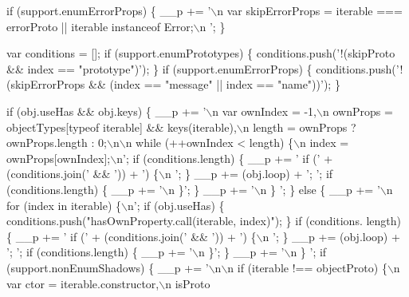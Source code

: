 \begin{DoxyCodeInclude}
       \textcolor{keywordflow}{if} (support.enumErrorProps) \{
      \_\_p += \textcolor{stringliteral}{'\(\backslash\)n  var skipErrorProps = iterable === errorProto || iterable instanceof Error;\(\backslash\)n  '};
       \}

          var conditions = [];    \textcolor{keywordflow}{if} (support.enumPrototypes) \{ conditions.push(\textcolor{stringliteral}{'!(skipProto && index ==
       "prototype")'}); \}    \textcolor{keywordflow}{if} (support.enumErrorProps)  \{ conditions.push(\textcolor{stringliteral}{'!(skipErrorProps && (index == "message"
       || index == "name"))'}); \}

       \textcolor{keywordflow}{if} (obj.useHas && obj.keys) \{
      \_\_p += \textcolor{stringliteral}{'\(\backslash\)n  var ownIndex = -1,\(\backslash\)n      ownProps = objectTypes[typeof iterable] && keys(iterable),\(\backslash\)n   
         length = ownProps ? ownProps.length : 0;\(\backslash\)n\(\backslash\)n  while (++ownIndex < length) \{\(\backslash\)n    index =
       ownProps[ownIndex];\(\backslash\)n'};
          \textcolor{keywordflow}{if} (conditions.length) \{
      \_\_p += \textcolor{stringliteral}{'    if ('} +
      (conditions.join(\textcolor{stringliteral}{' && '})) +
      \textcolor{stringliteral}{') \{\(\backslash\)n  '};
       \}
      \_\_p +=
      (obj.loop) +
      \textcolor{stringliteral}{';    '};
       \textcolor{keywordflow}{if} (conditions.length) \{
      \_\_p += \textcolor{stringliteral}{'\(\backslash\)n    \}'};
       \}
      \_\_p += \textcolor{stringliteral}{'\(\backslash\)n  \}  '};
       \} \textcolor{keywordflow}{else} \{
      \_\_p += \textcolor{stringliteral}{'\(\backslash\)n  for (index in iterable) \{\(\backslash\)n'};
          \textcolor{keywordflow}{if} (obj.useHas) \{ conditions.push(\textcolor{stringliteral}{"hasOwnProperty.call(iterable, index)"}); \}    \textcolor{keywordflow}{if} (conditions.
      length) \{
      \_\_p += \textcolor{stringliteral}{'    if ('} +
      (conditions.join(\textcolor{stringliteral}{' && '})) +
      \textcolor{stringliteral}{') \{\(\backslash\)n  '};
       \}
      \_\_p +=
      (obj.loop) +
      \textcolor{stringliteral}{';    '};
       \textcolor{keywordflow}{if} (conditions.length) \{
      \_\_p += \textcolor{stringliteral}{'\(\backslash\)n    \}'};
       \}
      \_\_p += \textcolor{stringliteral}{'\(\backslash\)n  \}    '};
       \textcolor{keywordflow}{if} (support.nonEnumShadows) \{
      \_\_p += \textcolor{stringliteral}{'\(\backslash\)n\(\backslash\)n  if (iterable !== objectProto) \{\(\backslash\)n    var ctor = iterable.constructor,\(\backslash\)n        isProto
}
\end{DoxyCodeInclude}
